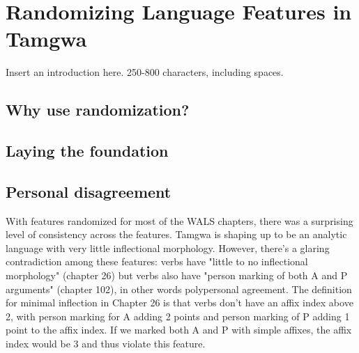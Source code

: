 \documentclass[a4paper,12pt,twoside,openright]{memoir}
\begin{document}


\chapter[Randomizing Language Features][Tamgwa]{Randomizing Language Features in Tamgwa}


\thispagestyle{fancy}
\BgUsetrue


Insert an introduction here. 250-800 characters, including spaces.

\section*{Why use randomization?} %

\lipsum[1]

\section*{Laying the foundation} %

\lipsum[2]

\lipsum[3]

\section*{Personal disagreement} %

With features randomized for most of the WALS chapters, there was a surprising level of consistency across the features.  Tamgwa is shaping up to be an analytic language with very little inflectional morphology. However, there's a glaring contradiction among these features: verbs have "little to no inflectional morphology" (chapter 26) but verbs also have "person marking of both A and P arguments" (chapter 102), in other words polypersonal agreement.  The definition for minimal inflection in Chapter 26 is that verbs don't have an affix index above 2, with person marking for A adding 2 points and person marking of P adding 1 point to the affix index.  If we marked both A and P with simple affixes, the affix index would be 3 and thus violate this feature.
\end{document}
